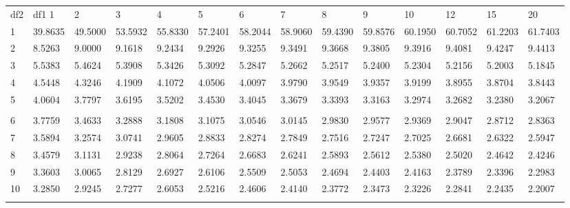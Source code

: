  {
 \fontsize{5pt}{5pt}
 \selectfont
\begin{tabular}{l|lllllllllllll} 
df2  & df1      1  &      2  &      3  &      4  &      5  &      6  &      7  &      8  &      9  &     10  &     12  &     15  &     20   \\ 
  1 & 39.8635 & 49.5000 & 53.5932 & 55.8330 & 57.2401 & 58.2044 & 58.9060 & 59.4390 & 59.8576 & 60.1950 & 60.7052 & 61.2203 & 61.7403 \\[5pt] \arrayrulecolor{light-gray}\hline\arrayrulecolor{black}  
  2 & 8.5263 & 9.0000 & 9.1618 & 9.2434 & 9.2926 & 9.3255 & 9.3491 & 9.3668 & 9.3805 & 9.3916 & 9.4081 & 9.4247 & 9.4413 \\[5pt] \arrayrulecolor{light-gray}\hline\arrayrulecolor{black}  
  3 & 5.5383 & 5.4624 & 5.3908 & 5.3426 & 5.3092 & 5.2847 & 5.2662 & 5.2517 & 5.2400 & 5.2304 & 5.2156 & 5.2003 & 5.1845 \\[5pt] \arrayrulecolor{light-gray}\hline\arrayrulecolor{black}  
  4 & 4.5448 & 4.3246 & 4.1909 & 4.1072 & 4.0506 & 4.0097 & 3.9790 & 3.9549 & 3.9357 & 3.9199 & 3.8955 & 3.8704 & 3.8443 \\[5pt] \arrayrulecolor{light-gray}\hline\arrayrulecolor{black}  
  5 & 4.0604 & 3.7797 & 3.6195 & 3.5202 & 3.4530 & 3.4045 & 3.3679 & 3.3393 & 3.3163 & 3.2974 & 3.2682 & 3.2380 & 3.2067 \\[5pt] \arrayrulecolor{light-gray}\hline\arrayrulecolor{black}  
\\ 
  6 & 3.7759 & 3.4633 & 3.2888 & 3.1808 & 3.1075 & 3.0546 & 3.0145 & 2.9830 & 2.9577 & 2.9369 & 2.9047 & 2.8712 & 2.8363 \\[5pt] \arrayrulecolor{light-gray}\hline\arrayrulecolor{black}  
  7 & 3.5894 & 3.2574 & 3.0741 & 2.9605 & 2.8833 & 2.8274 & 2.7849 & 2.7516 & 2.7247 & 2.7025 & 2.6681 & 2.6322 & 2.5947 \\[5pt] \arrayrulecolor{light-gray}\hline\arrayrulecolor{black}  
  8 & 3.4579 & 3.1131 & 2.9238 & 2.8064 & 2.7264 & 2.6683 & 2.6241 & 2.5893 & 2.5612 & 2.5380 & 2.5020 & 2.4642 & 2.4246 \\[5pt] \arrayrulecolor{light-gray}\hline\arrayrulecolor{black}  
  9 & 3.3603 & 3.0065 & 2.8129 & 2.6927 & 2.6106 & 2.5509 & 2.5053 & 2.4694 & 2.4403 & 2.4163 & 2.3789 & 2.3396 & 2.2983 \\[5pt] \arrayrulecolor{light-gray}\hline\arrayrulecolor{black}  
 10 & 3.2850 & 2.9245 & 2.7277 & 2.6053 & 2.5216 & 2.4606 & 2.4140 & 2.3772 & 2.3473 & 2.3226 & 2.2841 & 2.2435 & 2.2007 \\[5pt] \arrayrulecolor{light-gray}\hline\arrayrulecolor{black}  

\end{tabular}}
